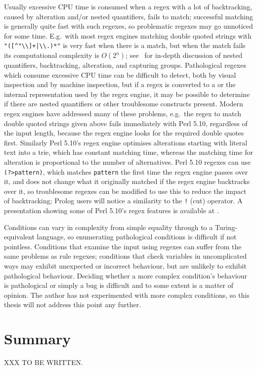Usually excessive CPU time is consumed when a regex with a lot of
backtracking, caused by alteration and/or nested quantifiers, fails to
match; successful matching is generally quite fast with such regexes, so
problematic regexes may go unnoticed for some time.  E.g.\ with most regex
engines matching double quoted strings with \verb!"([^"\\]+|\\.)*"! is very
fast when there is a match, but when the match fails its computational
complexity is $O(2^{n})$; see~\cite{mastering-regular-expressions} for
in-depth discussion of nested quantifiers, backtracking, alteration, and
capturing groups.  Pathological regexes which consume excessive CPU time
can be difficult to detect, both by visual inspection and by machine
inspection, but if a regex is converted to a  or the internal
representation used by the regex engine, it may be possible to determine if
there are nested quantifiers or other troublesome constructs present.
Modern regex engines have addressed many of these problems, e.g.\ the regex
to match double quoted strings given above fails immediately with Perl
5.10, regardless of the input length, because the regex engine looks for
the required double quotes first.  Similarly Perl 5.10's regex engine
optimises alterations starting with literal text into a trie, which has
constant matching time, whereas the matching time for alteration is
proportional to the number of alternatives.  Perl 5.10 regexes can use
\verb!(?>pattern)!, which matches \verb!pattern! the first time the regex
engine passes over it, and does not change what it originally matched if
the regex engine backtracks over it, so troublesome regexes can be modified
to use this to reduce the impact of backtracking; Prolog users will notice
a similarity to the \verb'!' (cut) operator.  A presentation showing some
of Perl 5.10's regex features is available at
.

Conditions can vary in complexity from simple equality through to a
Turing-equivalent language, so enumerating pathological conditions is
difficult if not pointless.  Conditions that examine the input using
regexes can suffer from the same problems as rule regexes; conditions that
check variables in uncomplicated ways may exhibit unexpected or incorrect
behaviour, but are unlikely to exhibit pathological behaviour.  Deciding
whether a more complex condition's behaviour is pathological or simply a
bug is difficult and to some extent is a matter of opinion.  The author has
not experimented with more complex conditions, so this thesis will not
address this point any further.

\section{Summary}

XXX TO BE WRITTEN\@.

